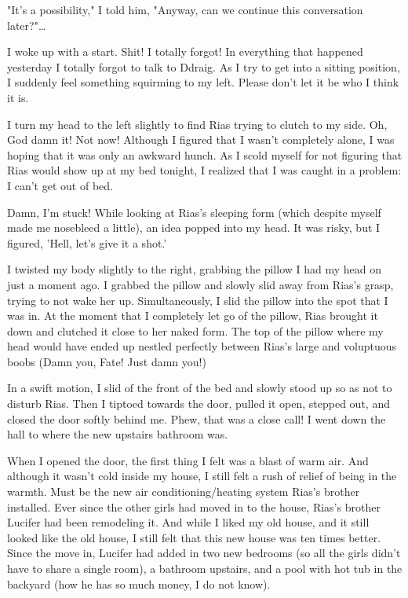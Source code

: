 \documentclass{article}
\begin{document}
"It's a possibility," I told him, "Anyway, can we continue this conversation later?"…

I woke up with a start. Shit! I totally forgot! In everything that happened yesterday I totally forgot to talk to Ddraig. As I try to get into a sitting position, I suddenly feel something squirming to my left. Please don't let it be who I think it is.

I turn my head to the left slightly to find Rias trying to clutch to my side. Oh, God damn it! Not now! Although I figured that I wasn't completely alone, I was hoping that it was only an awkward hunch. As I scold myself for not figuring that Rias would show up at my bed tonight, I realized that I was caught in a problem: I can't get out of bed.

Damn, I'm stuck! While looking at Rias's sleeping form (which despite myself made me nosebleed a little), an idea popped into my head. It was risky, but I figured, 'Hell, let's give it a shot.'

I twisted my body slightly to the right, grabbing the pillow I had my head on just a moment ago. I grabbed the pillow and slowly slid away from Rias's grasp, trying to not wake her up. Simultaneously, I slid the pillow into the spot that I was in. At the moment that I completely let go of the pillow, Rias brought it down and clutched it close to her naked form. The top of the pillow where my head would have ended up nestled perfectly between Rias's large and voluptuous boobs (Damn you, Fate! Just damn you!)

In a swift motion, I slid of the front of the bed and slowly stood up so as not to disturb Rias. Then I tiptoed towards the door, pulled it open, stepped out, and closed the door softly behind me. Phew, that was a close call! I went down the hall to where the new upstairs bathroom was.

When I opened the door, the first thing I felt was a blast of warm air. And although it wasn't cold inside my house, I still felt a rush of relief of being in the warmth. Must be the new air conditioning/heating system Rias's brother installed. Ever since the other girls had moved in to the house, Rias's brother Lucifer had been remodeling it. And while I liked my old house, and it still looked like the old house, I still felt that this new house was ten times better. Since the move in, Lucifer had added in two new bedrooms (so all the girls didn't have to share a single room), a bathroom upstairs, and a pool with hot tub in the backyard (how he has so much money, I do not know).
\end{document}
